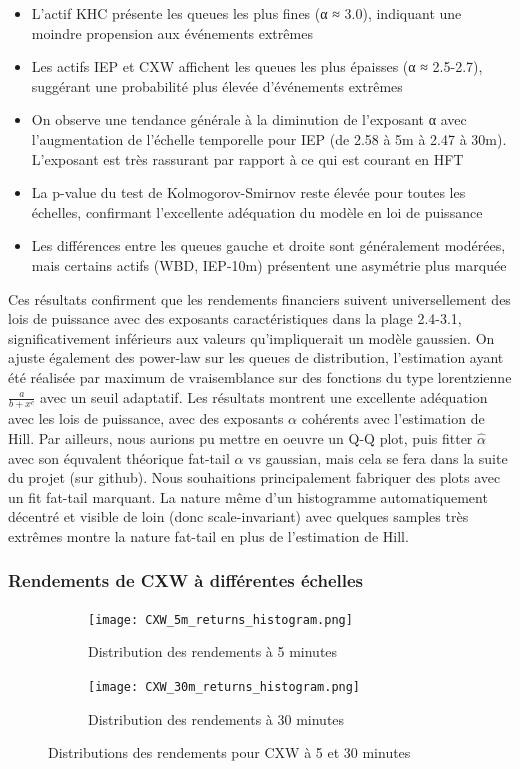 \documentclass[10pt,a4paper]{article}
\theoremstyle{definition}
\theoremstyle{remark}
\begin{document}
\begin{itemize}
\begin{itemize}
    \item L'actif KHC présente les queues les plus fines (α ≈ 3.0), indiquant une moindre propension aux événements extrêmes
    \item Les actifs IEP et CXW affichent les queues les plus épaisses (α ≈ 2.5-2.7), suggérant une probabilité plus élevée d'événements extrêmes
    \item On observe une tendance générale à la diminution de l'exposant α avec l'augmentation de l'échelle temporelle pour IEP (de 2.58 à 5m à 2.47 à 30m). L'exposant est très rassurant par rapport à ce qui est courant en HFT \cite{saddier2024bayesiantheorymarketimpact}
    \item La p-value du test de Kolmogorov-Smirnov reste élevée pour toutes les échelles, confirmant l'excellente adéquation du modèle en loi de puissance
    \item Les différences entre les queues gauche et droite sont généralement modérées, mais certains actifs (WBD, IEP-10m) présentent une asymétrie plus marquée
\end{itemize}
Ces résultats confirment que les rendements financiers suivent universellement des lois de puissance avec des exposants caractéristiques dans la plage 2.4-3.1, significativement inférieurs aux valeurs qu'impliquerait un modèle gaussien. On ajuste également des power-law sur les queues de distribution, l'estimation ayant été réalisée par maximum de vraisemblance sur des fonctions du type lorentzienne $\frac{a}{b+x^c}$ avec un seuil adaptatif. Les résultats montrent une excellente adéquation avec les lois de puissance, avec des exposants $\alpha$ cohérents avec l'estimation de Hill. Par ailleurs, nous aurions pu mettre en oeuvre un Q-Q plot, puis fitter $\hat \alpha$ avec son équvalent théorique fat-tail $\alpha$ vs gaussian, mais cela se fera dans la suite du projet (sur github). Nous souhaitions principalement fabriquer des plots avec un fit fat-tail marquant. La nature même d'un histogramme automatiquement décentré et visible de loin (donc scale-invariant) avec quelques samples très extrêmes montre la nature fat-tail en plus de l'estimation de Hill.

\subsubsection{Rendements de CXW à différentes échelles}

\begin{figure}[H]
    \centering
    \begin{subfigure}[b]{0.45\textwidth}
        \texttt{[image: CXW\_5m\_returns\_histogram.png]}
        \caption{Distribution des rendements à 5 minutes}
        \label{fig:CXW_5m_moved}
    \end{subfigure}
    \hfill
    \begin{subfigure}[b]{0.45\textwidth}
        \texttt{[image: CXW\_30m\_returns\_histogram.png]}
        \caption{Distribution des rendements à 30 minutes}
        \label{fig:CXW_30m_moved}
    \end{subfigure}
    \caption{Distributions des rendements pour CXW à 5 et 30 minutes}
\end{figure}


\end{itemize}
\end{document}
